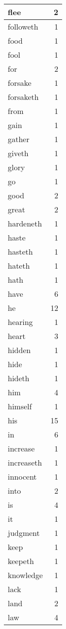 \begin{center}
\begin{longtable}{l|r}
flee & 2\\ \hline 
followeth & 1\\ \hline 
food & 1\\ \hline 
fool & 1\\ \hline 
for & 2\\ \hline 
forsake & 1\\ \hline 
forsaketh & 1\\ \hline 
from & 1\\ \hline 
gain & 1\\ \hline 
gather & 1\\ \hline 
giveth & 1\\ \hline 
glory & 1\\ \hline 
go & 1\\ \hline 
good & 2\\ \hline 
great & 2\\ \hline 
hardeneth & 1\\ \hline 
haste & 1\\ \hline 
hasteth & 1\\ \hline 
hateth & 1\\ \hline 
hath & 1\\ \hline 
have & 6\\ \hline 
he & 12\\ \hline 
hearing & 1\\ \hline 
heart & 3\\ \hline 
hidden & 1\\ \hline 
hide & 1\\ \hline 
hideth & 1\\ \hline 
him & 4\\ \hline 
himself & 1\\ \hline 
his & 15\\ \hline 
in & 6\\ \hline 
increase & 1\\ \hline 
increaseth & 1\\ \hline 
innocent & 1\\ \hline 
into & 2\\ \hline 
is & 4\\ \hline 
it & 1\\ \hline 
judgment & 1\\ \hline 
keep & 1\\ \hline 
keepeth & 1\\ \hline 
knowledge & 1\\ \hline 
lack & 1\\ \hline 
land & 2\\ \hline 
law & 4\\ \hline 

\end{longtable}
\end{center}
